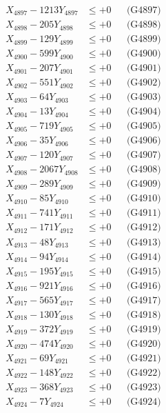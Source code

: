 \documentclass[a4paper,10pt]{article}
\begin{document}
{\begin{align}
X_{4897} - 1213Y_{4897} &\leq +0 && \text{(G4897)} \\
X_{4898} - 205Y_{4898} &\leq +0 && \text{(G4898)} \\
X_{4899} - 129Y_{4899} &\leq +0 && \text{(G4899)} \\
X_{4900} - 599Y_{4900} &\leq +0 && \text{(G4900)} \\
\allowbreak
X_{4901} - 207Y_{4901} &\leq +0 && \text{(G4901)} \\
X_{4902} - 551Y_{4902} &\leq +0 && \text{(G4902)} \\
X_{4903} - 64Y_{4903} &\leq +0 && \text{(G4903)} \\
X_{4904} - 13Y_{4904} &\leq +0 && \text{(G4904)} \\
X_{4905} - 719Y_{4905} &\leq +0 && \text{(G4905)} \\
X_{4906} - 35Y_{4906} &\leq +0 && \text{(G4906)} \\
X_{4907} - 120Y_{4907} &\leq +0 && \text{(G4907)} \\
X_{4908} - 2067Y_{4908} &\leq +0 && \text{(G4908)} \\
X_{4909} - 289Y_{4909} &\leq +0 && \text{(G4909)} \\
X_{4910} - 85Y_{4910} &\leq +0 && \text{(G4910)} \\
\allowbreak
X_{4911} - 741Y_{4911} &\leq +0 && \text{(G4911)} \\
X_{4912} - 171Y_{4912} &\leq +0 && \text{(G4912)} \\
X_{4913} - 48Y_{4913} &\leq +0 && \text{(G4913)} \\
X_{4914} - 94Y_{4914} &\leq +0 && \text{(G4914)} \\
X_{4915} - 195Y_{4915} &\leq +0 && \text{(G4915)} \\
X_{4916} - 921Y_{4916} &\leq +0 && \text{(G4916)} \\
X_{4917} - 565Y_{4917} &\leq +0 && \text{(G4917)} \\
X_{4918} - 130Y_{4918} &\leq +0 && \text{(G4918)} \\
X_{4919} - 372Y_{4919} &\leq +0 && \text{(G4919)} \\
X_{4920} - 474Y_{4920} &\leq +0 && \text{(G4920)} \\
\allowbreak
X_{4921} - 69Y_{4921} &\leq +0 && \text{(G4921)} \\
X_{4922} - 148Y_{4922} &\leq +0 && \text{(G4922)} \\
X_{4923} - 368Y_{4923} &\leq +0 && \text{(G4923)} \\
X_{4924} - 7Y_{4924} &\leq +0 && \text{(G4924)} \\

\end{align}}
\end{document}
